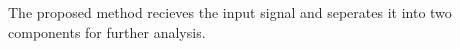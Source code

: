 The proposed method recieves the input signal and seperates it into two components for further analysis.
